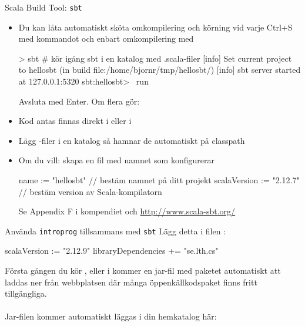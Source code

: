 \begin{Slide}{Scala Build Tool: \texttt{sbt}}\SlideFontSmall
\begin{itemize}
\item Du kan låta  automatiskt sköta omkompilering och körning vid varje Ctrl+S med kommandot 
och enbart omkompilering med 
\begin{REPL}
> sbt              # kör igång sbt i en katalog med .scala-filer
[info] Set current project to hellosbt (in build file:/home/bjornr/tmp/hellosbt/)
[info] sbt server started at 127.0.0.1:5320
sbt:hellosbt> ~run
\end{REPL}
Avsluta med Enter. Om flera  gör: 
\item Kod antas finnas direkt i  eller i 
\item Lägg -filer i en katalog  så hamnar de automatiskt på classpath
\item Om du vill: skapa en fil med namnet  som konfigurerar 
\begin{Code}
name := "hellosbt"          // bestäm namnet på ditt projekt
scalaVersion := "2.12.7"    // bestäm version av Scala-kompilatorn
\end{Code}
Se Appendix F i kompendiet och \url{http://www.scala-sbt.org/}
\end{itemize}
\end{Slide}



\begin{Slide}{Använda \texttt{introprog} tillsammans med \texttt{sbt}}
Lägg detta i filen :
\begin{Code}
scalaVersion := "2.12.9"
libraryDependencies += "se.lth.cs" %
\end{Code}
Första gången du kör ,  eller  i  kommer en jar-fil med paketet  automatiskt att laddas ner från webbplatsen  där många öppenkällkodspaket finns fritt tillgängliga. \\~\\

Jar-filen kommer automatiskt läggas i din hemkatalog här: \\
\end{Slide}


